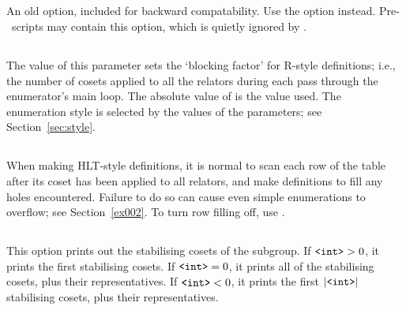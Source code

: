 \subsection{}

An old option, included for backward compatability.
Use the  option instead.
Pre-\acet\ scripts may contain this option, which is quietly ignored
  by \acet.

\subsection{}

The value of this parameter sets the `blocking factor' for R-style
  definitions; i.e., the number of cosets applied to all the relators
  during each pass through the enumerator's main loop.
The absolute value of  is the value used.
The enumeration style is selected by the values of the  \amp
   parameters; see Section~\ref{sec:style}.

\subsection{}

When making HLT-style definitions, it is normal to scan each row of the
  table after its coset has been applied to all relators, and make 
  definitions to fill any holes encountered.
Failure to do so can cause even simple enumerations to overflow; see
  Section~\ref{ex002}.
To turn row filling off, use .
  
\subsection{}

This option prints out the stabilising cosets of the subgroup.
If $\texttt{<int>} > 0$, it prints the first  stabilising cosets.
If $\texttt{<int>} = 0$, it prints all of the stabilising cosets, plus their
  representatives.
If $\texttt{<int>} < 0$, it prints the first $|\texttt{<int>}|$ stabilising cosets,
  plus their representatives.

\subsection{}

